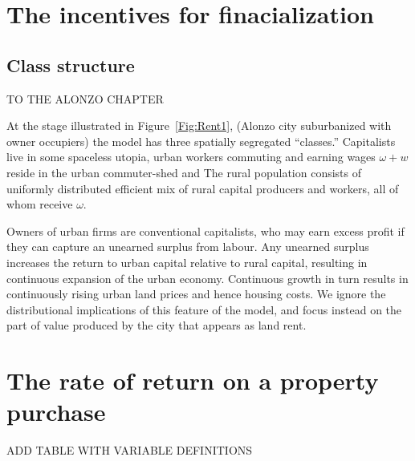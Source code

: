 \section{The incentives for finacialization}%
\subsection{Class structure}\label{Sec:ClassStucture}TO THE ALONZO CHAPTER

At the stage illustrated in Figure~\ref{Fig:Rent1},  (Alonzo city suburbanized with owner occupiers) the model has three spatially segregated ``classes.'' Capitalists live in some spaceless utopia, urban workers commuting and earning wages $\omega + w$ reside in the urban commuter-shed and  %
The rural population consists of uniformly distributed efficient mix of rural capital producers and workers, all of whom receive $\omega$.%



 Owners of urban firms are  conventional  capitalists, who may earn excess profit if they can capture an unearned surplus from labour.  Any unearned surplus increases the return to urban capital relative to rural capital, resulting in continuous expansion of the urban economy. Continuous growth in turn results in continuously rising urban land prices and hence housing costs. We ignore the distributional implications of this feature of the model, and focus instead on the part of value produced by the city that appears as land rent. 
  
  





\section{The rate of return on a property purchase}


ADD TABLE WITH VARIABLE DEFINITIONS
 
